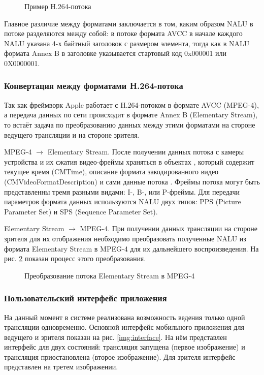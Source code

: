			\begin{figure}[H]
				\caption{Пример H.264-потока}
				\label{img:h264-stream}
			\end{figure}

			Главное различие между форматами заключается в том, каким образом NALU в потоке разделяются между
			собой: в потоке формата AVCC в начале каждого NALU указана 4-х байтный заголовок с размером элемента, тогда
			как в NALU формата Annex B в заголовке указывается стартовый код 0x000001 или 0X0000001.

			\subsubsection{Конвертация между форматами H.264-потока}
			Так как фреймворк Apple работает с H.264-потоком в формате AVCC (MPEG-4), а передача данных по сети
			происходит в формате Annex B (Elementary Stream), то встаёт задача по преобразованию данных между этими
			форматами на стороне ведущего трансляции и на стороне зрителя.

			MPEG-4 $\rightarrow$ Elementary Stream. После получении данных потока с камеры устройства и их сжатия
			видео-фреймы храняться в объектах
			, который содержит текущее время (CMTime),
			описание формата закодированного видео (CMVideoFormatDescription) и сами данные потока
			. Фреймы потока могут быть представленны тремя разными видами: I-, B-, или P-фреймы.
			Для передачи параметров формата данных используются NALU двух типов: PPS (Picture Parameter Set) и SPS
			(Sequence Parameter Set).

			Elementary Stream $\rightarrow$ MPEG-4. При получении данных трансляции на стороне зрителя для их отображения
			необходимо преобразовать полученные NALU из формата Elementary Stream в MPEG-4 для их дальнейшего
			воспроизведения. На рис. \ref{img:annex-b-to-avcc-stream} показан процесс этого преобразования.

			\begin{figure}[h]
				\caption{Преобразование потока Elementary Stream в MPEG-4}
				\label{img:annex-b-to-avcc-stream}
			\end{figure}

			\subsubsection{Пользовательский интерфейс приложения}
			На данный момент в системе реализована возможность ведения только одной трансляции одновременно. Основной
			интерфейс мобильного приложения для ведущего и зрителя показан на рис. \ref{img:interface}. На нём
			представлен интерфейс для двух состояний: трансляция запущена (первое изображение) и трансляция
			приостановлена (второе изображение). Для зрителя интерфейс представлен на третем изображении.

